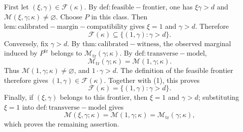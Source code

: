 First let \((\xi,\gamma)\in\mathcal F(\kappa)\). By \(\mathrm{def:feasible-frontier}\), one has \(\xi\gamma>d\) and \(\mathcal M(\xi,\gamma;\kappa)\ne\varnothing\). Choose \(P\) in this class. Then \(\mathrm{lem:calibrated-margin-compatibility}\) gives \(\xi=1\) and \(\gamma>d\). Therefore
\[
\mathcal F(\kappa)\subseteq\{(1,\gamma):\gamma>d\}.
\tag{1}
\]
Conversely, fix \(\gamma>d\). By \(\mathrm{thm:calibrated-witness}\), the observed marginal induced by \(P^{\mathrm{tr}}\) belongs to \(\mathcal M_{\mathrm{tr}}(\gamma;\kappa)\). By \(\mathrm{def:transverse-model}\),
\[
\mathcal M_{\mathrm{tr}}(\gamma;\kappa)=\mathcal M(1,\gamma;\kappa).
\]
Thus \(\mathcal M(1,\gamma;\kappa)\ne\varnothing\), and \(1\cdot\gamma>d\). The definition of the feasible frontier therefore gives \((1,\gamma)\in\mathcal F(\kappa)\). Together with (1), this proves
\[
\mathcal F(\kappa)=\{(1,\gamma):\gamma>d\}.
\]
Finally, if \((\xi,\gamma)\) belongs to this frontier, then \(\xi=1\) and \(\gamma>d\); substituting \(\xi=1\) into \(\mathrm{def:transverse-model}\) gives
\[
\mathcal M(\xi,\gamma;\kappa)=\mathcal M(1,\gamma;\kappa)=\mathcal M_{\mathrm{tr}}(\gamma;\kappa),
\]
which proves the remaining assertion.